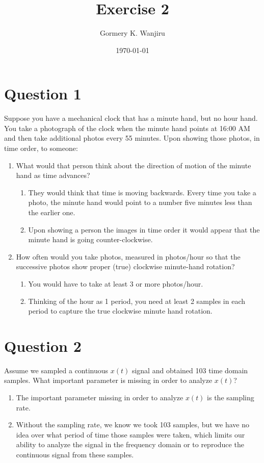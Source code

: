 \documentclass{article}
\title{Exercise 2}
\author{Gormery K. Wanjiru}
\date{\today}
\begin{document}
\maketitle

\section*{Question 1}
Suppose you have a mechanical clock that has a minute hand, but no hour hand. You take a photograph of the clock when the minute hand points at 16:00 AM and then take additional photos every 55 minutes. Upon showing those photos, in time order, to someone:
\begin{enumerate}
    \item What would that person think about the direction of motion of the minute hand as time advances?
    \begin{enumerate}
        \item They would think that time is moving backwards. Every time you take a photo, the minute hand would point to a number five minutes less than the earlier one.
        \item Upon showing a person the images in time order it would appear that the minute hand is going counter-clockwise.
    \end{enumerate}
    \item How often would you take photos, measured in photos/hour so that the successive photos show proper (true) clockwise minute-hand rotation?
    \begin{enumerate}
        \item You would have to take at least 3 or more photos/hour.
        \item Thinking of the hour as 1 period, you need at least 2 samples in each period to capture the true clockwise minute hand rotation.
    \end{enumerate}
\end{enumerate}

\section*{Question 2}
Assume we sampled a continuous \( x(t) \) signal and obtained 103 time domain samples. What important parameter is missing in order to analyze \( x(t) \)?
\begin{enumerate}
    \item The important parameter missing in order to analyze \( x(t) \) is the sampling rate.
    \item Without the sampling rate, we know we took 103 samples, but we have no idea over what period of time those samples were taken, which limits our ability to analyze the signal in the frequency domain or to reproduce the continuous signal from these samples.
\end{enumerate}
\end{document}
